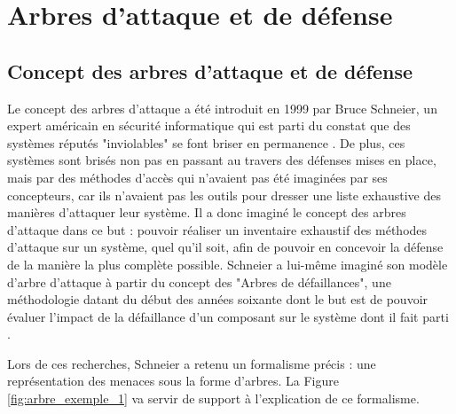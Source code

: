 \section{Arbres d'attaque et de défense}
	\label{sec:etat_art}

    \subsection{Concept des arbres d'attaque et de défense}
        Le concept des arbres d'attaque a été introduit en 1999 par Bruce Schneier, un expert américain en sécurité informatique qui est parti du constat que des systèmes réputés "inviolables" se font briser en permanence \cite{doc_Schneier}. De plus, ces systèmes sont brisés non pas en passant au travers des défenses mises en place, mais par des méthodes d'accès qui n'avaient pas été imaginées par ses concepteurs, car ils n'avaient pas les outils pour dresser une liste exhaustive des manières d'attaquer leur système. Il a donc imaginé le concept des arbres d'attaque dans ce but : pouvoir réaliser un inventaire exhaustif des méthodes d'attaque sur un système, quel qu'il soit, afin de pouvoir en concevoir la défense de la manière la plus complète possible. Schneier a lui-même imaginé son modèle d'arbre d'attaque à partir du concept des "Arbres de défaillances", une méthodologie datant du début des années soixante dont le but est de pouvoir évaluer l'impact de la défaillance d'un composant sur le système dont il fait parti \cite{defaillanceTree}. 

		Lors de ces recherches, Schneier a retenu un formalisme précis : une représentation des menaces sous la forme d'arbres. La Figure \ref{fig:arbre_exemple_1} va servir de support à l'explication de ce formalisme.

